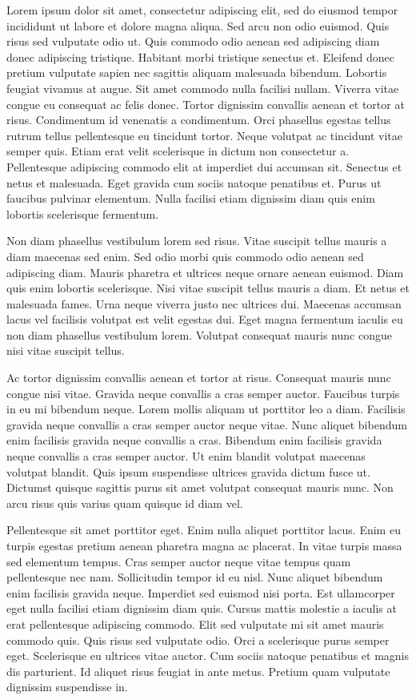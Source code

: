 Lorem ipsum dolor sit amet, consectetur adipiscing elit, sed do eiusmod tempor
incididunt ut labore et dolore magna aliqua. Sed arcu non odio euismod. Quis
risus sed vulputate odio ut. Quis commodo odio aenean sed adipiscing diam donec
adipiscing tristique. Habitant morbi tristique senectus et. Eleifend donec
pretium vulputate sapien nec sagittis aliquam malesuada bibendum. Lobortis
feugiat vivamus at augue. Sit amet commodo nulla facilisi nullam. Viverra vitae
congue eu consequat ac felis donec. Tortor dignissim convallis aenean et tortor
at risus. Condimentum id venenatis a condimentum. Orci phasellus egestas tellus
rutrum tellus pellentesque eu tincidunt tortor. Neque volutpat ac tincidunt
vitae semper quis. Etiam erat velit scelerisque in dictum non consectetur a.
Pellentesque adipiscing commodo elit at imperdiet dui accumsan sit. Senectus et
netus et malesuada. Eget gravida cum sociis natoque penatibus et. Purus ut
faucibus pulvinar elementum. Nulla facilisi etiam dignissim diam quis enim
lobortis scelerisque fermentum.

Non diam phasellus vestibulum lorem sed risus. Vitae suscipit tellus mauris a
diam maecenas sed enim. Sed odio morbi quis commodo odio aenean sed adipiscing
diam. Mauris pharetra et ultrices neque ornare aenean euismod. Diam quis enim
lobortis scelerisque. Nisi vitae suscipit tellus mauris a diam. Et netus et
malesuada fames. Urna neque viverra justo nec ultrices dui. Maecenas accumsan
lacus vel facilisis volutpat est velit egestas dui. Eget magna fermentum
iaculis eu non diam phasellus vestibulum lorem. Volutpat consequat mauris nunc
congue nisi vitae suscipit tellus.

Ac tortor dignissim convallis aenean et tortor at risus. Consequat mauris nunc
congue nisi vitae. Gravida neque convallis a cras semper auctor. Faucibus
turpis in eu mi bibendum neque. Lorem mollis aliquam ut porttitor leo a diam.
Facilisis gravida neque convallis a cras semper auctor neque vitae. Nunc
aliquet bibendum enim facilisis gravida neque convallis a cras. Bibendum enim
facilisis gravida neque convallis a cras semper auctor. Ut enim blandit
volutpat maecenas volutpat blandit. Quis ipsum suspendisse ultrices gravida
dictum fusce ut. Dictumst quisque sagittis purus sit amet volutpat consequat
mauris nunc. Non arcu risus quis varius quam quisque id diam vel.

Pellentesque sit amet porttitor eget. Enim nulla aliquet porttitor lacus. Enim
eu turpis egestas pretium aenean pharetra magna ac placerat. In vitae turpis
massa sed elementum tempus. Cras semper auctor neque vitae tempus quam
pellentesque nec nam. Sollicitudin tempor id eu nisl. Nunc aliquet bibendum
enim facilisis gravida neque. Imperdiet sed euismod nisi porta. Est ullamcorper
eget nulla facilisi etiam dignissim diam quis. Cursus mattis molestie a iaculis
at erat pellentesque adipiscing commodo. Elit sed vulputate mi sit amet mauris
commodo quis. Quis risus sed vulputate odio. Orci a scelerisque purus semper
eget. Scelerisque eu ultrices vitae auctor. Cum sociis natoque penatibus et
magnis dis parturient. Id aliquet risus feugiat in ante metus. Pretium quam
vulputate dignissim suspendisse in.

